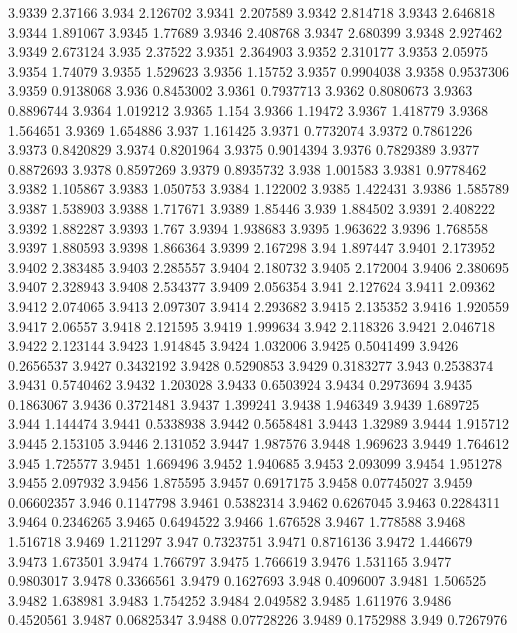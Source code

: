 3.9339  2.37166
3.934  2.126702
3.9341  2.207589
3.9342  2.814718
3.9343  2.646818
3.9344  1.891067
3.9345  1.77689
3.9346  2.408768
3.9347  2.680399
3.9348  2.927462
3.9349  2.673124
3.935  2.37522
3.9351  2.364903
3.9352  2.310177
3.9353  2.05975
3.9354  1.74079
3.9355  1.529623
3.9356  1.15752
3.9357  0.9904038
3.9358  0.9537306
3.9359  0.9138068
3.936  0.8453002
3.9361  0.7937713
3.9362  0.8080673
3.9363  0.8896744
3.9364  1.019212
3.9365  1.154
3.9366  1.19472
3.9367  1.418779
3.9368  1.564651
3.9369  1.654886
3.937  1.161425
3.9371  0.7732074
3.9372  0.7861226
3.9373  0.8420829
3.9374  0.8201964
3.9375  0.9014394
3.9376  0.7829389
3.9377  0.8872693
3.9378  0.8597269
3.9379  0.8935732
3.938  1.001583
3.9381  0.9778462
3.9382  1.105867
3.9383  1.050753
3.9384  1.122002
3.9385  1.422431
3.9386  1.585789
3.9387  1.538903
3.9388  1.717671
3.9389  1.85446
3.939  1.884502
3.9391  2.408222
3.9392  1.882287
3.9393  1.767
3.9394  1.938683
3.9395  1.963622
3.9396  1.768558
3.9397  1.880593
3.9398  1.866364
3.9399  2.167298
3.94  1.897447
3.9401  2.173952
3.9402  2.383485
3.9403  2.285557
3.9404  2.180732
3.9405  2.172004
3.9406  2.380695
3.9407  2.328943
3.9408  2.534377
3.9409  2.056354
3.941  2.127624
3.9411  2.09362
3.9412  2.074065
3.9413  2.097307
3.9414  2.293682
3.9415  2.135352
3.9416  1.920559
3.9417  2.06557
3.9418  2.121595
3.9419  1.999634
3.942  2.118326
3.9421  2.046718
3.9422  2.123144
3.9423  1.914845
3.9424  1.032006
3.9425  0.5041499
3.9426  0.2656537
3.9427  0.3432192
3.9428  0.5290853
3.9429  0.3183277
3.943  0.2538374
3.9431  0.5740462
3.9432  1.203028
3.9433  0.6503924
3.9434  0.2973694
3.9435  0.1863067
3.9436  0.3721481
3.9437  1.399241
3.9438  1.946349
3.9439  1.689725
3.944  1.144474
3.9441  0.5338938
3.9442  0.5658481
3.9443  1.32989
3.9444  1.915712
3.9445  2.153105
3.9446  2.131052
3.9447  1.987576
3.9448  1.969623
3.9449  1.764612
3.945  1.725577
3.9451  1.669496
3.9452  1.940685
3.9453  2.093099
3.9454  1.951278
3.9455  2.097932
3.9456  1.875595
3.9457  0.6917175
3.9458  0.07745027
3.9459  0.06602357
3.946  0.1147798
3.9461  0.5382314
3.9462  0.6267045
3.9463  0.2284311
3.9464  0.2346265
3.9465  0.6494522
3.9466  1.676528
3.9467  1.778588
3.9468  1.516718
3.9469  1.211297
3.947  0.7323751
3.9471  0.8716136
3.9472  1.446679
3.9473  1.673501
3.9474  1.766797
3.9475  1.766619
3.9476  1.531165
3.9477  0.9803017
3.9478  0.3366561
3.9479  0.1627693
3.948  0.4096007
3.9481  1.506525
3.9482  1.638981
3.9483  1.754252
3.9484  2.049582
3.9485  1.611976
3.9486  0.4520561
3.9487  0.06825347
3.9488  0.07728226
3.9489  0.1752988
3.949  0.7267976
